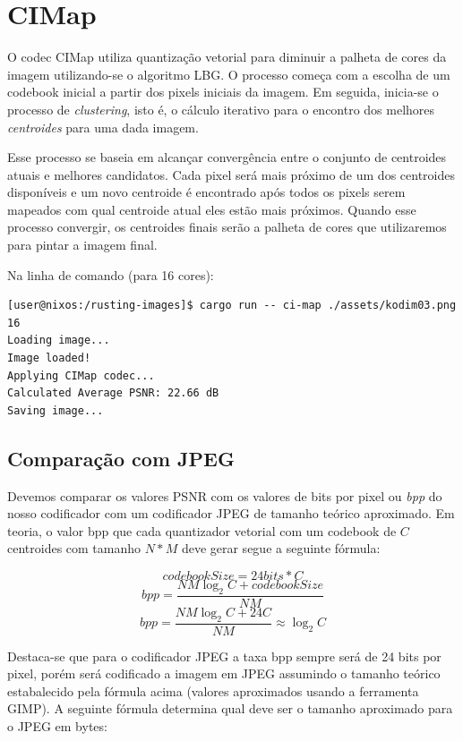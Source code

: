 \documentclass[11pt]{article}
\begin{document}
\section{CIMap}
\label{sec:org1201df9}

O codec CIMap utiliza quantização vetorial para diminuir a palheta de cores da imagem utilizando-se
o algoritmo LBG. O processo começa com a escolha de um codebook inicial a partir dos pixels
iniciais da imagem. Em seguida, inicia-se o processo de \emph{clustering}, isto é, o cálculo iterativo
para o encontro dos melhores \emph{centroides} para uma dada imagem.

Esse processo se baseia em alcançar convergência entre o conjunto de centroides atuais e melhores
candidatos. Cada pixel será mais próximo de um dos centroides disponíveis e um novo centroide
é encontrado após todos os pixels serem mapeados com qual centroide atual eles estão mais próximos.
Quando esse processo convergir, os centroides finais serão a palheta de cores que utilizaremos para
pintar a imagem final.

Na linha de comando (para 16 cores):

\begin{verbatim}
[user@nixos:/rusting-images]$ cargo run -- ci-map ./assets/kodim03.png 16
Loading image...
Image loaded!
Applying CIMap codec...
Calculated Average PSNR: 22.66 dB
Saving image...
\end{verbatim}

\subsection{Comparação com JPEG}
\label{sec:org832d1ad}

Devemos comparar os valores PSNR com os valores de bits por pixel ou \emph{bpp} do nosso codificador
com um codificador JPEG de tamanho teórico aproximado. Em teoria, o valor bpp que cada quantizador vetorial com um
codebook de \(C\) centroides com tamanho \(N*M\) deve gerar segue a seguinte fórmula:

$$ codebookSize = 24 bits * C $$
$$ bpp = \frac{NM \log_2 C + codebookSize}{NM} $$
$$ bpp = \frac{NM \log_2 C + 24C}{NM} \approx \log_2 C $$

Destaca-se que para o codificador JPEG a taxa bpp sempre será de 24 bits por pixel, porém será codificado a imagem em JPEG assumindo
o tamanho teórico estabalecido pela fórmula acima (valores aproximados usando a ferramenta GIMP). A seguinte fórmula determina qual
deve ser o tamanho aproximado para o JPEG em bytes:
\end{document}

